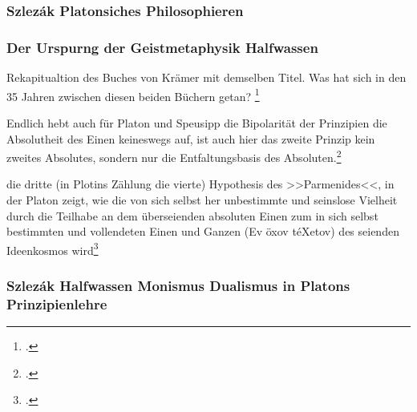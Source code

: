 \subsubsection*{Szlezák Platonsiches Philosophieren}
\subsubsection*{Der Urspurng der Geistmetaphysik Halfwassen}
Rekapitualtion des Buches von Krämer mit demselben Titel. Was hat sich in den 35 Jahren zwischen diesen beiden Büchern getan? \footcite[vgl.][S. 50]{HalfwassenGeistmetaphysik}

Endlich hebt auch für Platon und Speusipp die Bipolarität der Prinzipien die Absolutheit des Einen keineswegs auf, ist auch hier das zweite Prinzip kein zweites Absolutes, sondern nur die Entfaltungsbasis des Absoluten.\footcite[][S. 53]{HalfwassenGeistmetaphysik}


die dritte (in Plotins Zählung die vierte) Hypothesis des >>Parmenides<<, in der Platon zeigt, wie die von sich selbst her unbestimmte und seinslose Vielheit durch die Teilhabe an dem überseienden absoluten Einen zum in sich selbst bestimmten und vollendeten Einen und Ganzen (Ev öxov téXetov) des seienden Ideenkosmos wird\footcite[vgl.][S. 54f.]{HalfwassenGeistmetaphysik}


\subsubsection*{Szlezák Halfwassen Monismus Dualismus in Platons Prinzipienlehre}

